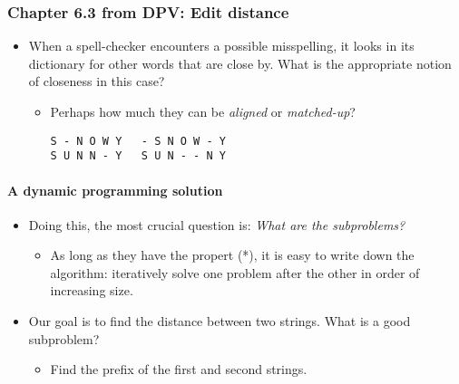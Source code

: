 \documentclass[a4paper,11pt]{article}
\begin{document}
\subsubsection{Chapter 6.3 from DPV: Edit
distance}\label{chapter-6.3-from-dpv-edit-distance}

\begin{itemize}
\itemsep1pt\parskip0pt
\item
  When a spell-checker encounters a possible misspelling, it looks in
  its dictionary for other words that are close by. What is the
  appropriate notion of closeness in this case?

  \begin{itemize}
  \item
    Perhaps how much they can be \emph{aligned} or \emph{matched-up}?

\begin{verbatim}
S - N O W Y   - S N O W - Y
S U N N - Y   S U N - - N Y
\end{verbatim}
  \end{itemize}
\end{itemize}

\paragraph{A dynamic programming
solution}\label{a-dynamic-programming-solution}

\begin{itemize}
\itemsep1pt\parskip0pt
\item
  Doing this, the most crucial question is: \emph{What are the
  subproblems?}

  \begin{itemize}
  \itemsep1pt\parskip0pt
  \item
    As long as they have the propert (*), it is easy to write down the
    algorithm: iteratively solve one problem after the other in order of
    increasing size.
  \end{itemize}
\item
  Our goal is to find the distance between two strings. What is a good
  subproblem?

  \begin{itemize}
  \itemsep1pt\parskip0pt
  \item
    Find the prefix of the first and second strings.
  \end{itemize}
\end{itemize}
\end{document}
